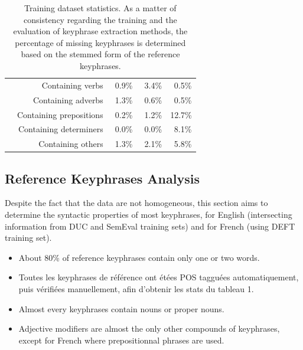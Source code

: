 \begin{table}
\begin{tabular}{rrccc}
        & Containing verbs & $~~$0.9\% & $~~$3.4\% & $~~$0.5\%\\
        & Containing adverbs & $~~$1.3\% & $~~$0.6\% & $~~$0.5\%\\
        & Containing prepositions & $~~$0.2\% & $~~$1.2\% & 12.7\%\\
        & Containing determiners & $~~$0.0\% & $~~$0.0\% & $~~$8.1\%\\
        & Containing others & $~~$1.3\% & $~~$2.1\% & $~~$5.8\%\\
        \bottomrule
      \end{tabular}
      \caption{Training dataset statistics. As a matter of consistency regarding
               the training and the evaluation of keyphrase extraction methods,
               the percentage of missing keyphrases is determined based on the
               stemmed form of the reference keyphrases.
               \label{tab:train_dataset_statistics}}
    \end{table}

  \subsection{Reference Keyphrases Analysis}
  \label{subsec:keyphrase_analysis}
    Despite the fact that the data are not homogeneous, this section aims to
    determine the syntactic properties of most keyphrases, for English
    (intersecting information from DUC and SemEval training sets) and for French
    (using DEFT training set).

    \begin{itemize}
      \item{About 80\% of reference keyphrases contain only one or two words.}
      \item{Toutes les keyphrases de référence ont étées POS tagguées
            automatiquement, puis vérifiées manuellement, afin d'obtenir les
            stats du tableau 1.}
      \item{Almost every keyphrases contain nouns or proper nouns.}
      \item{Adjective modifiers are almost the only other compounds of
            keyphrases, except for French where prepositionnal phrases are
            used.}
    \end{itemize}
